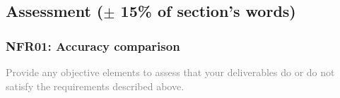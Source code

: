 \subsection{Assessment ($\pm$ 15\% of section's words)}
\subsubsection{NFR01: Accuracy comparison}
\textcolor{gray}{Provide any objective elements to assess that your deliverables
do or do not satisfy the requirements described above. }
